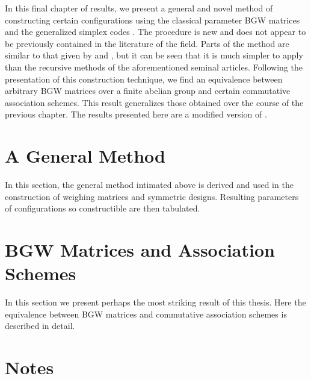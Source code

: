 \documentclass[../../main]{subfiles}
\begin{document}
In this final chapter of results, we present a general and novel method
of constructing certain configurations using the classical parameter BGW
matrices and the generalized simplex codes \cite[see][]{w-mat-construct}. The
procedure is new and does not appear to be previously contained in the
literature of the field. Parts of the method are similar to that given by
\cite{rajkundlia} and \cite{ionin-bgw-bibd}, but it can be seen that it is much
simpler to apply than the recursive methods of the aforementioned seminal
articles. Following the presentation of this construction technique, we find an
equivalence between arbitrary BGW matrices over a finite abelian group and
certain commutative association schemes. This result generalizes those obtained
over the course of the previous chapter. The results presented here are a
modified version of \cite{w-mat-construct}. 

\fancyhf{}

\fancyhead[RO,LE]{\thepage}

 \section{\centering A General Method}
 
 In this section, the general method intimated above is derived and used in the
 construction of weighing matrices and symmetric designs. Resulting parameters
 of configurations so constructible are then tabulated. 
 
 \dinkus
 
 
 
 \fancyhf{}

 \fancyhead[RO,LE]{\thepage}

 \section{\centering BGW Matrices and Association Schemes}
 
 In this section we present perhaps the most striking result of this thesis. Here
 the equivalence between BGW matrices and commutative association schemes is
 described in detail. 
 
 \dinkus
 
 
 
 \singlespace
 
 \fancyhf{}

 \fancyhead[RO,LE]{\thepage}

 \section*{\centering Notes}
 \thefnotes
 
 \doublespacing
 
 \biblio
\end{document}
